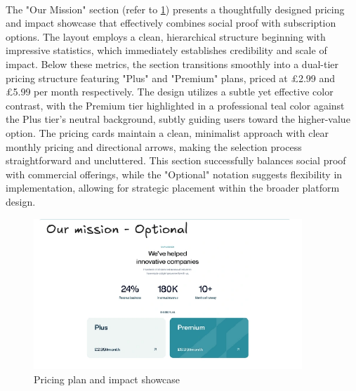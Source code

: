 \paragraph{} The "Our Mission" section (refer to \ref{fig:option}) presents a thoughtfully designed pricing and impact showcase that effectively combines social proof with subscription options. The layout employs a clean, hierarchical structure beginning with impressive statistics, which immediately establishes credibility and scale of impact. Below these metrics, the section transitions smoothly into a dual-tier pricing structure featuring "Plus" and "Premium" plans, priced at \pounds 2.99 and \pounds 5.99 per month respectively. The design utilizes a subtle yet effective color contrast, with the Premium tier highlighted in a professional teal color against the Plus tier's neutral background, subtly guiding users toward the higher-value option. The pricing cards maintain a clean, minimalist approach with clear monthly pricing and directional arrows, making the selection process straightforward and uncluttered. This section successfully balances social proof with commercial offerings, while the "Optional" notation suggests flexibility in implementation, allowing for strategic placement within the broader platform design.
\begin{figure}[h]
    \centering
    \includegraphics[width= 0.9\textwidth]{root/option.png}
     \caption{Pricing plan and impact showcase}
    \label{fig:option}
\end{figure}
